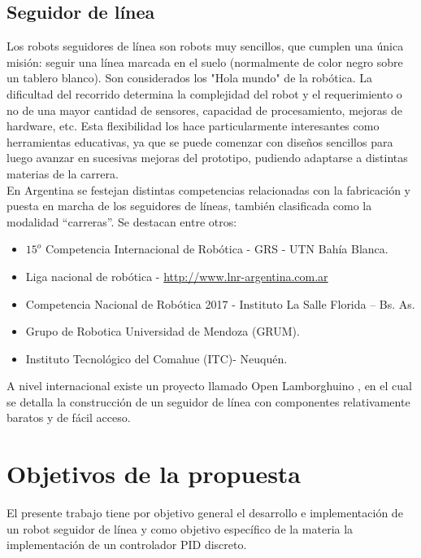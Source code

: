 \documentclass[10pt,conference,a4paper,onecolumn]{article}%
\begin{document}
 \subsection{Seguidor de línea}
 Los robots seguidores de línea son robots muy sencillos, que cumplen una única misión: seguir una línea marcada en el suelo (normalmente de color negro sobre un tablero blanco). Son considerados los "Hola mundo" de la robótica. La dificultad del recorrido determina la complejidad del robot y el requerimiento o no de una mayor cantidad de sensores, capacidad de procesamiento, mejoras de hardware, etc. Esta flexibilidad los hace particularmente interesantes como herramientas educativas, ya que se puede comenzar con diseños sencillos para luego avanzar en sucesivas mejoras del prototipo, pudiendo adaptarse a distintas materias de
la carrera.\\
En Argentina se festejan distintas competencias relacionadas con la fabricación y puesta en marcha de los seguidores de líneas, también clasificada como la modalidad “carreras”. Se destacan entre otros:
\begin{itemize}
\item $15^o$ Competencia Internacional de Robótica - GRS - UTN Bahía Blanca.
\item Liga nacional de robótica - \url{http://www.lnr-argentina.com.ar}
\item Competencia Nacional de Robótica 2017 - Instituto La Salle Florida – Bs. As.
\item Grupo de Robotica Universidad de Mendoza (GRUM).
\item Instituto Tecnológico del Comahue (ITC)- Neuquén.
\end{itemize}
A nivel internacional existe un proyecto llamado Open Lamborghuino \cite{lambo}, en el cual se detalla la construcción
de un seguidor de línea con componentes relativamente baratos y de fácil acceso.

\section{Objetivos de la propuesta}
\label{objetivos}

El presente trabajo tiene por objetivo general el desarrollo e implementación de un robot seguidor de línea y como objetivo específico de la materia la implementación de un controlador PID discreto.
\end{document}
